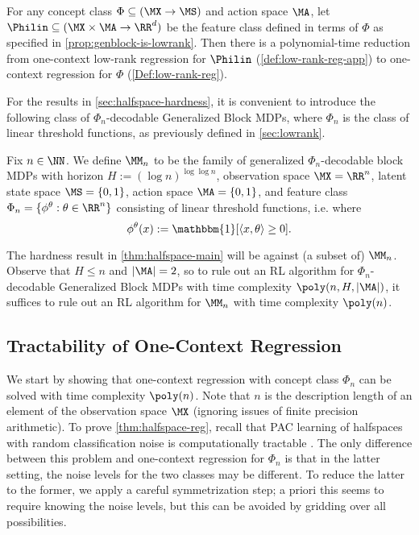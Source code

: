 \begin{proposition}[Informal]\label{prop:gen-block-ocr}
For any concept class $\Phi \subseteq (\MX\to\MS)$ and action space $\MA$, let $\Philin \subseteq (\MX\times\MA\to\RR^d)$ be the feature class defined in terms of $\Phi$ as specified in \cref{prop:genblock-is-lowrank}. Then there is a polynomial-time reduction from one-context low-rank regression for $\Philin$ (\cref{def:low-rank-reg-app}) to one-context regression for $\Phi$ (\cref{Def:low-rank-reg}).  
\end{proposition}

For the results in \cref{sec:halfspace-hardness}, it is convenient to introduce the following class of $\Phi_n$-decodable Generalized Block MDPs, where $\Phi_n$ is the class of linear threshold functions, as previously defined in \cref{sec:lowrank}.

\begin{definition}\label{def:halfspace-mdps-apx}
Fix $n \in \NN$. We define $\MM_n$ to be the family of generalized $\Phi_n$-decodable block MDPs with horizon $H := (\log n)^{\log \log n}$, observation space $\MX = \RR^n$, latent state space $\MS = \{0,1\}$, action space $\MA = \{0,1\}$, and feature class $\Phi_n = \{\phi^\theta: \theta \in \RR^n\}$ consisting of linear threshold functions, i.e. where 
\[\phi^\theta(x) := \mathbbm{1}[\langle x,\theta\rangle \geq 0].\]
\end{definition}

The hardness result in \cref{thm:halfspace-main} will be against (a subset of) $\MM_n$. Observe that $H \leq n$ and $|\MA| = 2$, so to rule out an RL algorithm for $\Phi_n$-decodable Generalized Block MDPs with time complexity $\poly(n,H,|\MA|)$, it suffices to rule out an RL algorithm for $\MM_n$ with time complexity $\poly(n)$.


\subsection{Tractability of One-Context Regression}\label{sec:halfspace-ocr}

We start by showing that one-context regression with concept class $\Phi_n$ can be solved with time complexity $\poly(n)$. Note that $n$ is the description length of an element of the observation space $\MX$ (ignoring issues of finite precision arithmetic). To prove \cref{thm:halfspace-reg}, recall that PAC learning of halfspaces with random classification noise is computationally tractable \citep{blum1998polynomial,diakonikolas2023strongly}. The only difference between this problem and one-context regression for $\Phi_n$ is that in the latter setting, the noise levels for the two classes may be different. To reduce the latter to the former, we apply a careful symmetrization step; a priori this seems to require knowing the noise levels, but this can be avoided by gridding over all possibilities.

